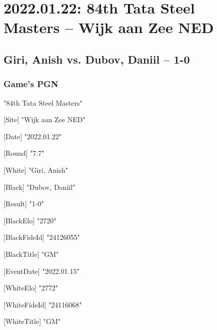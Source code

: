 \documentclass[9pt]{extarticle}
\begin{document}
\setlength{\columnsep}{32pt}
\section*{2022.01.22: 84th Tata Steel Masters -- Wijk aan Zee NED}

\subsection*{Giri, Anish vs. Dubov, Daniil -- 1-0}
\subsubsection*{Game's PGN}
\begin{flushleft}
[Event] "84th Tata Steel Masters"

[Site] "Wijk aan Zee NED"

[Date] "2022.01.22"

[Round] "7.7"

[White] "Giri, Anish"

[Black] "Dubov, Daniil"

[Result] "1-0"

[BlackElo] "2720"

[BlackFideId] "24126055"

[BlackTitle] "GM"

[EventDate] "2022.01.15"

[WhiteElo] "2772"

[WhiteFideId] "24116068"

[WhiteTitle] "GM"

\end{flushleft}
\parindent 0mm
\end{document}
